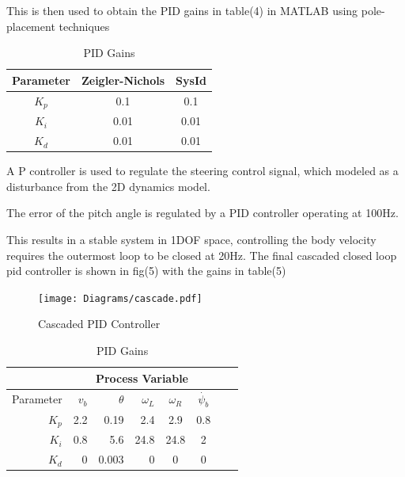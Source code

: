         This is then used to obtain the PID gains in table(4) in MATLAB using pole-placement techniques
        \begin{table}[H]
            \centering
            \begin{tabular}{|c|c|c|}
                \hline
                Parameter & Zeigler-Nichols & SysId \\
                \hline 
                $K_p$ & 0.1 & 0.1 \\
                $K_i$ & 0.01 & 0.01 \\
                $K_d$ & 0.01 & 0.01 \\
                \hline
            \end{tabular}
            \caption{PID Gains}
        \end{table}

        A P controller is used to regulate the steering control signal, which modeled
        as a disturbance from the 2D dynamics model.

        The error of the pitch angle is regulated by a PID controller operating at 100Hz. 
        
        This results in a stable system in 1DOF space, controlling the body velocity requires the outermost loop to be closed at 20Hz.
        The final cascaded closed loop pid controller is shown in fig(5) with the gains in table(5)

        \begin{figure}[H]
            \texttt{[image: Diagrams/cascade.pdf]}
            \caption{Cascaded PID Controller}
        \end{figure}

        \begin{table}[H]
            \centering
            \begin{tabular}{|r|r|r|r|c|c|c|c}
                \hline
                & \multicolumn{5}{c|}{Process Variable}  \\
                \hline
                Parameter & $v_b$ & $\theta$  & $\omega_L$ & $\omega_R$ & $\dot{\psi_b}$ \\
                \hline      
                $K_p$ & 2.2 & 0.19 & 2.4 & 2.9 & 0.8 \\
                $K_i$ & 0.8 & 5.6 & 24.8 & 24.8 & 2\\
                $K_d$ & 0 & 0.003 & 0 & 0  &  0\\
                \hline
            \end{tabular}
            \caption{PID Gains}
        \end{table}
        \pagebreak{}
